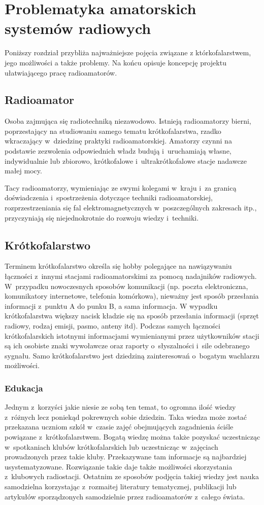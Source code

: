 \documentclass[eng,oneside]{mgr}
\begin{document}
	\chapter{Problematyka amatorskich systemów radiowych}
	\label{sec:teoretical_description}
	Poniższy rozdział przybliża najważniejsze pojęcia związane z którkofalarstwem, jego możliwości a także problemy. Na końcu opisuje koncepcję projektu ułatwiającego pracę radioamatorów.
		
		\section{Radioamator}
		Osoba zajmująca się radiotechniką niezawodowo. Istnieją radioamatorzy bierni, poprzestający na studiowaniu samego tematu krótkofalarstwa, rzadko wkraczający w~dziedzinę praktyki radioamatorskiej. Amatorzy czynni na podstawie zezwolenia odpowiednich władz budują i~uruchamiają własne, indywidualnie lub zbiorowo, krótkofalowe i~ultrakrótkofalowe stacje nadawcze małej mocy.

		Tacy radioamatorzy, wymieniając ze swymi kolegami w~kraju i~za granicą doświadczenia i~spostrzeżenia dotyczące techniki radioamatorskiej, rozprzestrzeniania się fal elektromagnetycznych w~poszczególnych zakresach itp., przyczyniają się niejednokrotnie do rozwoju wiedzy i~techniki. 

		\section{Krótkofalarstwo}
		Terminem krótkofalarstwo określa się hobby polegające na nawiązywaniu łączności z~innymi stacjami radioamatorskimi za pomocą nadajników radiowych. W~przypadku nowoczesnych sposobów komunikacji (np. poczta elektroniczna, komunikatory internetowe, telefonia komórkowa), nieważny jest sposób przesłania informacji z~punktu A do punku B, a sama informacja. W wypadku krótkofalarstwa większy nacisk kładzie się na sposób przesłania informacji (sprzęt radiowy, rodzaj emisji, pasmo, anteny itd). Podczas samych łączności krótkofalarskich istotnymi informacjami wymienianymi przez użytkowników stacji są ich osobiste znaki wywoławcze oraz raporty o~słyszalności i~sile odebranego sygnału. Samo krótkofalarstwo jest dziedziną zainteresowań o~bogatym wachlarzu możliwości. 

			\subsection{Edukacja}
			Jednym z~korzyści jakie niesie ze sobą ten temat, to ogromna ilość wiedzy z~różnych lecz poniekąd pokrewnych sobie dziedzin. Taka wiedza może zostać przekazana uczniom szkół w~czasie zajęć obejmujących zagadnienia ściśle powiązane z~krótkofalarstwem. Bogatą wiedzę można także pozyskać uczestnicząc w~spotkaniach klubów krótkofalarskich lub uczestnicząc w~zajęciach prowadzonych przez takie kluby. Przekazywane tam informacje są najbardziej usystematyzowane. Rozwiązanie takie daje także możliwości skorzystania z~klubowych radiostacji. Ostatnim ze sposobów podjęcia takiej wiedzy jest nauka samodzielna korzystając z~rozmaitej literatury tematycznej, publikacji lub artykułów sporządzonych samodzielnie przez radioamatorów z~całego świata. 
\end{document}
